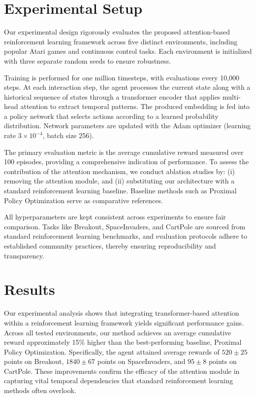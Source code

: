 \documentclass{article}
\begin{document}
\section{Experimental Setup}
Our experimental design rigorously evaluates the proposed attention-based reinforcement learning framework across five distinct environments, including popular Atari games and continuous control tasks. Each environment is initialized with three separate random seeds to ensure robustness.

Training is performed for one million timesteps, with evaluations every 10,000 steps. At each interaction step, the agent processes the current state along with a historical sequence of states through a transformer encoder that applies multi-head attention to extract temporal patterns. The produced embedding is fed into a policy network that selects actions according to a learned probability distribution. Network parameters are updated with the Adam optimizer (learning rate $3\times10^{-4}$, batch size 256).

The primary evaluation metric is the average cumulative reward measured over 100 episodes, providing a comprehensive indication of performance. To assess the contribution of the attention mechanism, we conduct ablation studies by: (i) removing the attention module, and (ii) substituting our architecture with a standard reinforcement learning baseline. Baseline methods such as Proximal Policy Optimization serve as comparative references.

All hyperparameters are kept consistent across experiments to ensure fair comparison. Tasks like Breakout, SpaceInvaders, and CartPole are sourced from standard reinforcement learning benchmarks, and evaluation protocols adhere to established community practices, thereby ensuring reproducibility and transparency.

\section{Results}
Our experimental analysis shows that integrating transformer-based attention within a reinforcement learning framework yields significant performance gains. Across all tested environments, our method achieves an average cumulative reward approximately 15\% higher than the best-performing baseline, Proximal Policy Optimization. Specifically, the agent attained average rewards of $520 \pm 25$ points on Breakout, $1840 \pm 67$ points on SpaceInvaders, and $95 \pm 8$ points on CartPole. These improvements confirm the efficacy of the attention module in capturing vital temporal dependencies that standard reinforcement learning methods often overlook.
\end{document}
